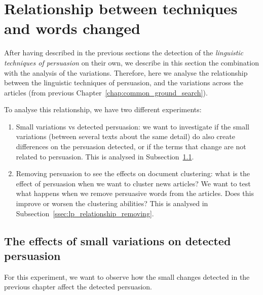 \section{\statusgreen Relationship between techniques and words changed}
\label{sec:lp_relationship}

After having described in the previous sections the detection of the \emph{linguistic techniques of persuasion} on their own, we describe in this section the combination with the analysis of the variations.
Therefore, here we analyse the relationship between the linguistic techniques of persuasion, and the variations across the articles (from previous Chapter~\ref{chap:common_ground_search}).

To analyse this relationship, we have two different experiments:

\begin{enumerate}
    \item Small variations vs detected persuasion: we want to investigate if the small variations (between several texts about the same detail) do also create differences on the persuasion detected, or if the terms that change are not related to persuasion. This is analysed in Subsection~\ref{ssec:lp_relationship_small_variations}.
    \item Removing persuasion to see the effects on document clustering: what is the effect of persuasion when we want to cluster news articles? We want to test what happens when we remove persuasive words from the articles. Does this improve or worsen the clustering abilities? This is analysed in Subsection~\ref{ssec:lp_relationship_removing}. %
\end{enumerate}

\subsection{\statusgreen The effects of small variations on detected persuasion}
\label{ssec:lp_relationship_small_variations}



For this experiment, we want to observe how the small changes detected in the previous chapter affect the detected persuasion.

